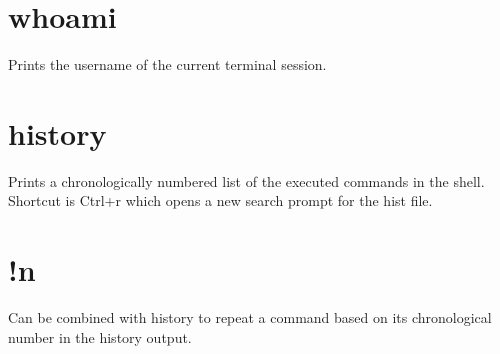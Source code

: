 \documentclass[]{article}
\begin{document}
\section{whoami}

Prints the username of the current terminal session.

\section{history}

Prints a chronologically numbered list of the executed commands in the shell. Shortcut is Ctrl+r which opens a new search prompt for the hist file.

\section{!n}

Can be combined with history to repeat a command based on its chronological number in the history output.
\end{document}
